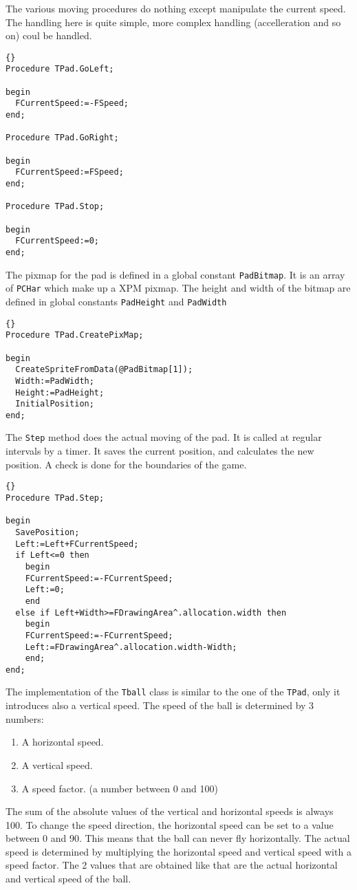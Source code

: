 \documentclass[10pt]{article}
\newcommand{\var}[1]{\texttt{#1}}
\begin{document}
The various moving procedures do nothing except manipulate the current speed.
The handling here is quite simple, more complex handling (accelleration and
so on) coul be handled.
\begin{lstlisting}{}
Procedure TPad.GoLeft;

begin
  FCurrentSpeed:=-FSpeed;
end;

Procedure TPad.GoRight;

begin
  FCurrentSpeed:=FSpeed;
end;

Procedure TPad.Stop;

begin
  FCurrentSpeed:=0;
end;
\end{lstlisting}{}
The pixmap for the pad is defined in a global constant \var{PadBitmap}. It is 
an array of \var{PCHar} which make up a XPM pixmap. The height and width of 
the bitmap are defined in global constants \var{PadHeight} and \var{PadWidth}
\begin{lstlisting}{}
Procedure TPad.CreatePixMap; 

begin
  CreateSpriteFromData(@PadBitmap[1]);
  Width:=PadWidth;
  Height:=PadHeight;
  InitialPosition;
end;
\end{lstlisting}{}
The \var{Step} method does the actual moving of the pad. It is called at regular intervals
by a timer. It saves the current position, and calculates the new position. A check is 
done for the boundaries of the game.
\begin{lstlisting}{}
Procedure TPad.Step;

begin
  SavePosition;
  Left:=Left+FCurrentSpeed;
  if Left<=0 then
    begin
    FCurrentSpeed:=-FCurrentSpeed;
    Left:=0;
    end
  else if Left+Width>=FDrawingArea^.allocation.width then
    begin
    FCurrentSpeed:=-FCurrentSpeed;
    Left:=FDrawingArea^.allocation.width-Width;
    end;
end;
\end{lstlisting}{}

The implementation of the \var{Tball} class is similar to the one of the \var{TPad},
only it introduces also a vertical speed. The speed of the ball is determined by 3 
numbers:
\begin{enumerate}
\item A horizontal speed.
\item A vertical speed. 
\item A speed factor. (a number between 0 and 100)
\end{enumerate} 
The sum of the absolute values of the vertical and horizontal speeds is always 100. 
To change the speed direction, the horizontal speed can be set to a value between 0
and 90. This means that the ball can never fly horizontally. The actual speed is 
determined by multiplying the horizontal speed and vertical speed with a speed 
factor. The 2 values that are obtained like that are the actual horizontal and 
vertical speed of the ball.
\end{document}
